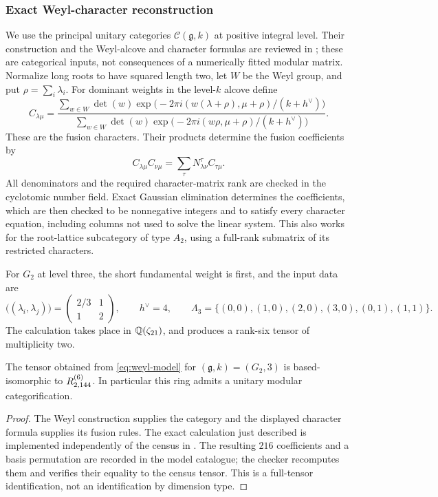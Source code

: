 

\subsubsection{Exact Weyl-character reconstruction}
We use the principal unitary categories $\mathcal C(\mathfrak g,k)$
at positive integral level. Their construction and the Weyl-alcove and
character formulas are reviewed in \cite{QGsurvey}; these are categorical
inputs, not consequences of a numerically fitted modular matrix. Normalize
long roots to have squared length two, let $W$ be the Weyl group, and put
$\rho=\sum_i\lambda_i$. For dominant weights in the level-$k$ alcove define
\begin{equation}\label{eq:weyl-model}
 C_{\lambda\mu}=\frac{\sum_{w\in W}\det(w)
 \exp\bigl(-2\pi i(w(\lambda+\rho),\mu+\rho)/(k+h^\vee)\bigr)}
 {\sum_{w\in W}\det(w)
 \exp\bigl(-2\pi i(w\rho,\mu+\rho)/(k+h^\vee)\bigr)}.
\end{equation}
These are the fusion characters. Their products determine the fusion
coefficients by
\[
 C_{\lambda\mu}C_{\nu\mu}=\sum_\tau N_{\lambda\nu}^{\tau}C_{\tau\mu}.
\]
All denominators and the required character-matrix rank are checked in the
cyclotomic number field. Exact Gaussian elimination determines the
coefficients, which are then checked to be nonnegative integers and to
satisfy every character equation, including columns not used to solve the
linear system. This also works for the root-lattice subcategory of type
$A_2$, using a full-rank submatrix of its restricted characters.

For $G_2$ at level three, the short fundamental weight is first, and the
input data are
\[
 \bigl((\lambda_i,\lambda_j)\bigr)=
 \begin{pmatrix}2/3&1\\1&2\end{pmatrix},\qquad h^\vee=4,
 \qquad\Lambda_3=\{(0,0),(1,0),(2,0),(3,0),(0,1),(1,1)\}.
\]
The calculation takes place in $\mathbb Q(\zeta_{21})$, and produces a
rank-six tensor of multiplicity two.
\begin{proposition}\label{prop:g2model}
The tensor obtained from \eqref{eq:weyl-model} for $(\mathfrak g,k)=(G_2,3)$
is based-isomorphic to $R^{(6)}_{2,144}$. In particular this ring admits a
unitary modular categorification.
\end{proposition}
\begin{proof}
The Weyl construction supplies the category and the displayed character
formula supplies its fusion rules. The exact calculation just described
is implemented independently of the census in
. The resulting $216$ coefficients
and a basis permutation are recorded in the model catalogue; the checker
recomputes them and verifies their equality to the census tensor. This is
a full-tensor identification, not an identification by dimension type.
\end{proof}

